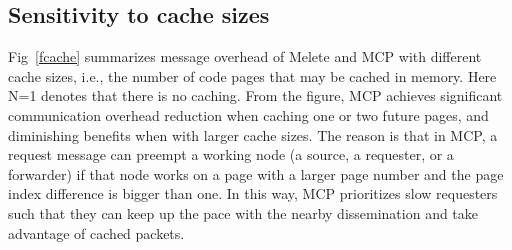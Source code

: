 \subsection{Sensitivity to cache sizes}
Fig~\ref{fcache} summarizes message overhead of Melete and MCP with different cache sizes, i.e., the number of code 
pages that may be cached in memory. Here N=1 denotes that there is no caching. From the figure, MCP achieves 
significant communication overhead reduction when caching one or two future pages, and diminishing benefits when with 
larger cache sizes. The reason is that in MCP, a request message can preempt a working node (a source, a requester, or 
a forwarder) if that node works on a page with a larger page number and the page index difference is bigger than one. 
In this way, MCP prioritizes slow requesters such that they can keep up the pace with the nearby dissemination and take 
advantage of cached packets.











